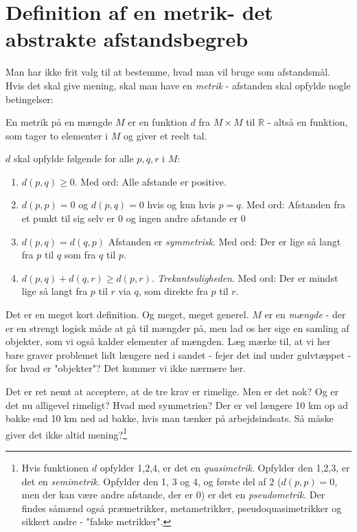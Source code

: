 \documentclass[a4paper, 12pt]{article}
\theoremstyle{remark}
\begin{document}
\section*{Definition af en metrik- det abstrakte afstandsbegreb}

Man har ikke frit valg til at bestemme, hvad man vil bruge som afstandsmål. Hvis det skal give mening, skal man have en \emph{metrik} - afstanden skal opfylde nogle betingelser: 
\begin{tcolorbox}[title=Metrik]
En metrik på en mængde $M$ er en funktion $d$ fra $M\times M$  til $\mathbb{R}$ - altså en funktion, som tager to elementer  i $M$ og giver et reelt tal.

$d$ skal opfylde følgende for alle $p,q,r$ i $M$:
\begin{enumerate}
\item $d(p,q)\geq 0$. Med ord: Alle afstande er positive.
\item $d(p,p)=0$ og $d(p,q)=0$ hvis og kun hvis $p=q$.  Med ord: Afstanden fra et punkt til sig selv er $0$ og ingen andre afstande er $0$
\item $d(p,q)=d(q,p)$ Afstanden er \emph{symmetrisk}. Med ord: Der er lige så langt fra $p$ til $q$ som fra $q$ til $p$.
\item $d(p,q)+d(q,r)\geq d(p,r)$. \emph{Trekantsuligheden}. Med ord:  Der er mindst lige så langt fra $p$ til $ r$ via $q$, som direkte fra $p$ til $r$. 
\end{enumerate}
\end{tcolorbox}

Det er en meget kort definition. Og meget, meget generel. $M$ er en \emph{mængde} - der er en strengt logisk måde at gå til mængder på, men lad os her sige en samling af objekter, som vi også kalder elementer af mængden. Læg mærke til, at vi her bare graver problemet lidt længere ned i sandet - fejer det ind under gulvtæppet - for hvad er "objekter"?  Det kommer vi ikke nærmere her. 

Det er ret nemt at acceptere, at de tre krav er rimelige. Men er det nok? Og er det nu alligevel rimeligt? Hvad med symmetrien? Der er vel længere 10 km op ad bakke end 10 km ned ad bakke, hvis man tænker på arbejdsindsats. Så måske giver det ikke altid mening?\footnote{ Hvis funktionen $d$ opfylder 1,2,4, er det en \emph{quasimetrik}. Opfylder den 1,2,3, er det en \emph{semimetrik}. Opfylder den 1, 3 og 4, og første del af 2 ($d(p,p)=0$, men der kan være andre afstande, der er $0$)  er det en \emph{pseudometrik}.  Der findes såmænd også præmetrikker, metametrikker, pseudoquasimetrikker og sikkert andre - "falske metrikker". }
\end{document}
